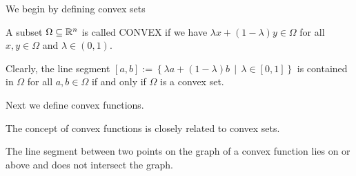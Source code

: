 We begin by defining convex sets

\begin{definition}
    A subset $\Omega\subseteq \mathbb{R}^n$ is called CONVEX if we have $\lambda x+(1-\lambda)y\in \Omega$ for all $x,y\in \Omega$ and $\lambda\in (0,1)$. 
  \end{definition}

  Clearly, the line segment $[a,b]:=\left\{ \lambda a+(1-\lambda)b\,\mid \, \lambda\in [0,1] \right\}$   is contained in $\Omega$ for all $a,b\in \Omega$ if and only if $\Omega$ is a convex set.
  
  Next we define convex functions. 
  
  The concept of convex functions is closely related to convex sets.
  
  The line segment between two points on the graph of a convex function lies on or above and does not intersect the graph.


